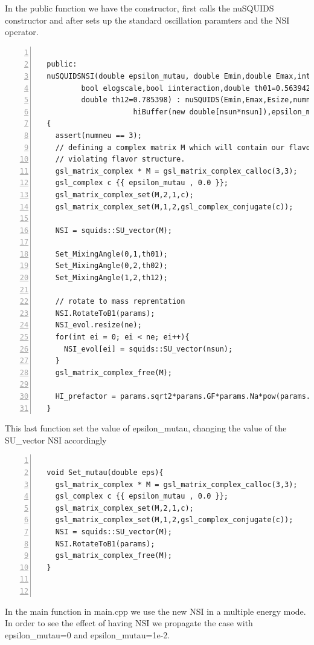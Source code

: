 In the public function we have the constructor, first calls the
nuSQUIDS constructor and after sets up the standard oscillation
paramters and the NSI operator.  
\begin{lstlisting}[frame=leftline, numbers =
  left,breaklines=true,label = ex:sin1,firstnumber=last]

  public:
  nuSQUIDSNSI(double epsilon_mutau, double Emin,double Emax,int Esize,int numneu, NeutrinoType NT,
	      bool elogscale,bool iinteraction,double th01=0.563942, double th02=0.154085, 
	      double th12=0.785398) : nuSQUIDS(Emin,Emax,Esize,numneu,NT,elogscale,iinteraction),
				      hiBuffer(new double[nsun*nsun]),epsilon_mutau(epsilon_mutau)
  {
    assert(numneu == 3);
    // defining a complex matrix M which will contain our flavor
    // violating flavor structure.
    gsl_matrix_complex * M = gsl_matrix_complex_calloc(3,3);
    gsl_complex c {{ epsilon_mutau , 0.0 }};
    gsl_matrix_complex_set(M,2,1,c);
    gsl_matrix_complex_set(M,1,2,gsl_complex_conjugate(c));
    
    NSI = squids::SU_vector(M);
    
    Set_MixingAngle(0,1,th01);
    Set_MixingAngle(0,2,th02);
    Set_MixingAngle(1,2,th12);
    
    // rotate to mass reprentation
    NSI.RotateToB1(params);
    NSI_evol.resize(ne);
    for(int ei = 0; ei < ne; ei++){
      NSI_evol[ei] = squids::SU_vector(nsun);
    }
    gsl_matrix_complex_free(M);
    
    HI_prefactor = params.sqrt2*params.GF*params.Na*pow(params.cm,-3);
  }

\end{lstlisting}

This last function set the value of {\ttf epsilon\_mutau}, changing the
value of the {\ttf SU\_vector NSI} accordingly 

\begin{lstlisting}[frame=leftline, numbers =
  left,breaklines=true,label = ex:sin1,firstnumber=last]
  
  void Set_mutau(double eps){
    gsl_matrix_complex * M = gsl_matrix_complex_calloc(3,3);
    gsl_complex c {{ epsilon_mutau , 0.0 }};
    gsl_matrix_complex_set(M,2,1,c);
    gsl_matrix_complex_set(M,1,2,gsl_complex_conjugate(c));
    NSI = squids::SU_vector(M);    
    NSI.RotateToB1(params);
    gsl_matrix_complex_free(M);
  }
 
  
\end{lstlisting}


In the main function in {\ttf main.cpp} we use the new NSI in a
multiple energy mode. In order to see the effect of having NSI we
propagate the case with {\ttf  epsilon\_mutau=0} and {\ttf
  epsilon\_mutau=1e-2}. 


